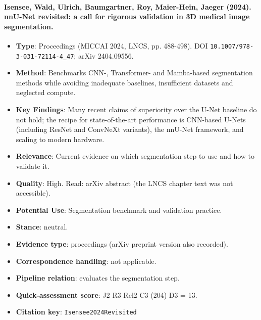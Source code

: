 \documentclass[journal,onecolumn]{IEEEtran}
\begin{document}
\paragraph{Isensee, Wald, Ulrich, Baumgartner, Roy, Maier-Hein, Jaeger (2024). nnU-Net revisited: a call for rigorous validation in 3D medical image segmentation.~\cite{Isensee2024Revisited}}\mbox{}

\begin{itemize}

\item{} \textbf{Type}: Proceedings (MICCAI 2024, LNCS, pp. 488-498). DOI \nolinkurl{10.1007/978-3-031-72114-4_47}; arXiv 2404.09556.

\item{} \textbf{Method}: Benchmarks CNN-, Transformer- and Mamba-based segmentation methods while avoiding inadequate baselines, insufficient datasets and neglected compute.

\item{} \textbf{Key Findings}: Many recent claims of superiority over the U-Net baseline do not hold; the recipe for state-of-the-art performance is CNN-based U-Nets (including ResNet and ConvNeXt variants), the nnU-Net framework, and scaling to modern hardware.

\item{} \textbf{Relevance}: Current evidence on which segmentation step to use and how to validate it.

\item{} \textbf{Quality}: High. Read: arXiv abstract (the LNCS chapter text was not accessible).

\item{} \textbf{Potential Use}: Segmentation benchmark and validation practice.

\item{} \textbf{Stance}: neutral.

\item{} \textbf{Evidence type}: proceedings (arXiv preprint version also recorded).

\item{} \textbf{Correspondence handling}: not applicable.

\item{} \textbf{Pipeline relation}: evaluates the segmentation step.

\item{} \textbf{Quick-assessment score}: J2 R3 Rel2 C3 (204) D3 = 13.

\item{} \textbf{Citation key}: \texttt{Isensee2024Revisited}

\end{itemize}
\end{document}
